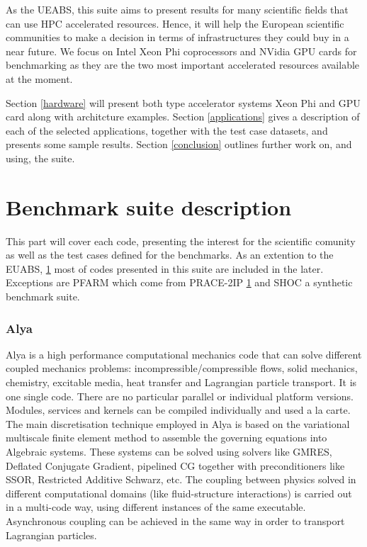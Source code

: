 As the UEABS, this suite aims to present results for many scientific fields that can use HPC accelerated resources. Hence, it will help the European scientific communities to make a decision in terms of infrastructures they could buy in a near future. We focus on Intel Xeon Phi coprocessors and NVidia GPU cards for benchmarking as they are the two most important accelerated resources available at the moment.

Section \ref{hardware} will present both type accelerator systems Xeon Phi and GPU card along with architcture examples. Section \ref{applications} gives a description of each of the selected applications, together with the test case datasets, and presents some sample results. Section \ref{conclusion} outlines further work on, and using, the suite.

\part{Benchmark suite description}
This part will cover each code, presenting the interest for the scientific comunity as well as the test cases defined for the benchmarks.
As an extention to the EUABS, \ref{} most of codes presented in this suite are included in the later. Exceptions are PFARM which come from PRACE-2IP \ref{} and SHOC a synthetic benchmark suite.
\section{Alya}
Alya is a high performance computational mechanics code that can solve different coupled mechanics problems: incompressible/compressible flows, solid mechanics, chemistry, excitable media, heat transfer and Lagrangian particle transport. It is one single code. There are no particular parallel or individual platform versions. Modules, services and kernels can be compiled individually and used a la carte. The main discretisation technique employed in Alya is based on the variational multiscale finite element method to assemble the governing equations into Algebraic systems. These systems can be solved using solvers like GMRES, Deflated Conjugate Gradient, pipelined CG together with preconditioners like SSOR, Restricted Additive Schwarz, etc. The coupling between physics solved in different computational domains (like fluid-structure interactions) is carried out in a multi-code way, using different instances of the same executable. Asynchronous coupling can be achieved in the same way in order to transport Lagrangian particles.

